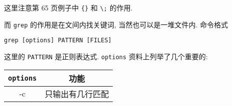 \documentclass[a4paper]{ctexart}
\begin{document}
这里注意第 65 页例子中 \verb|{}| 和 \verb|\;| 的作用\cite{zhoudx2020universality}.

而 \verb|grep| 的作用是在文间内找关键词, 当然也可以是一堆文件内. 命令格式
\begin{verbatim}
grep [options] PATTERN [FILES]
\end{verbatim}
这里的 \verb|PATTERN| 是正则表达式. \verb|options| 资料上列举了几个重要的:

\begin{table}
  \centering
  \begin{tabular}{|c|c|}
    \hline
    \verb|options| & 功能 \\
    \hline
    -c & 只输出有几行匹配\\
    \hline
    
  \end{tabular}
\end{table}






\end{document}
